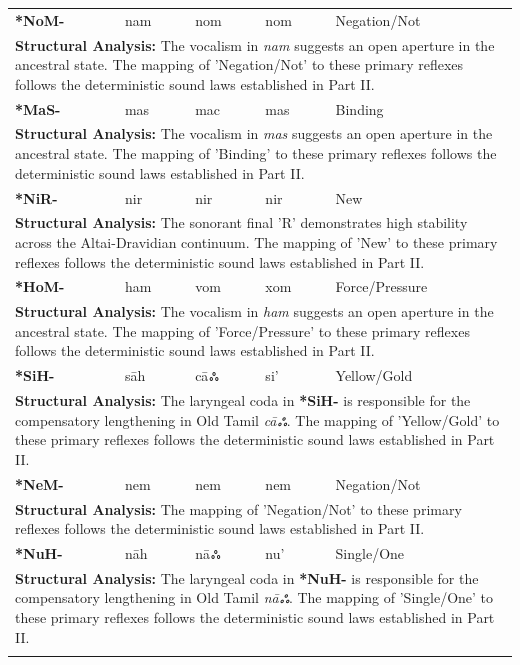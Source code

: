 \begin{longtable}{p{} p{} p{} p{} p{}}
\textbf{*NoM-} & nam & nom & nom & Negation/Not \\ 
\multicolumn{5}{p{\textwidth}}{\small \textbf{Structural Analysis:} The vocalism in \textit{nam} suggests an open aperture in the ancestral state. The mapping of 'Negation/Not' to these primary reflexes follows the deterministic sound laws established in Part II.} \\ \addlinespace[15pt] 
\textbf{*MaS-} & mas & mac & mas & Binding \\ 
\multicolumn{5}{p{\textwidth}}{\small \textbf{Structural Analysis:} The vocalism in \textit{mas} suggests an open aperture in the ancestral state. The mapping of 'Binding' to these primary reflexes follows the deterministic sound laws established in Part II.} \\ \addlinespace[15pt] 
\textbf{*NiR-} & nir & nir & nir & New \\ 
\multicolumn{5}{p{\textwidth}}{\small \textbf{Structural Analysis:} The sonorant final 'R' demonstrates high stability across the Altai-Dravidian continuum. The mapping of 'New' to these primary reflexes follows the deterministic sound laws established in Part II.} \\ \addlinespace[15pt] 
\textbf{*HoM-} & ham & vom & xom & Force/Pressure \\ 
\multicolumn{5}{p{\textwidth}}{\small \textbf{Structural Analysis:} The vocalism in \textit{ham} suggests an open aperture in the ancestral state. The mapping of 'Force/Pressure' to these primary reflexes follows the deterministic sound laws established in Part II.} \\ \addlinespace[15pt] 
\textbf{*SiH-} & sāh & cāஃ & si' & Yellow/Gold \\ 
\multicolumn{5}{p{\textwidth}}{\small \textbf{Structural Analysis:} The laryngeal coda in \textbf{*SiH-} is responsible for the compensatory lengthening in Old Tamil \textit{cāஃ}. The mapping of 'Yellow/Gold' to these primary reflexes follows the deterministic sound laws established in Part II.} \\ \addlinespace[15pt] 
\textbf{*NeM-} & nem & nem & nem & Negation/Not \\ 
\multicolumn{5}{p{\textwidth}}{\small \textbf{Structural Analysis:}  The mapping of 'Negation/Not' to these primary reflexes follows the deterministic sound laws established in Part II.} \\ \addlinespace[15pt] 
\textbf{*NuH-} & nāh & nāஃ & nu' & Single/One \\ 
\multicolumn{5}{p{\textwidth}}{\small \textbf{Structural Analysis:} The laryngeal coda in \textbf{*NuH-} is responsible for the compensatory lengthening in Old Tamil \textit{nāஃ}. The mapping of 'Single/One' to these primary reflexes follows the deterministic sound laws established in Part II.} \\ \addlinespace[15pt] 

\end{longtable}
